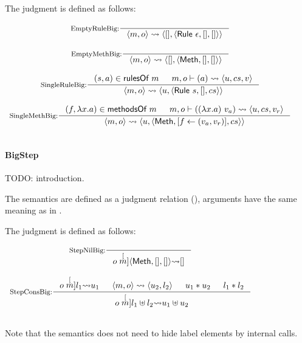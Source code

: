 \begin{definition}
  \label{def-sembigss}
  The judgment  is defined as follows:
  \begin{center}
    \begin{math}
      \begin{array}{c}
        \inference[EmptyRuleBig:]{}
                  {\sembigss{m}{o}{\emptymap}
                    {\alpharule{\epsilon}}{\emptymap}{\emptymap}} \\
        \mbox{} \\
        \inference[EmptyMethBig:]{}
                  {\sembigss{m}{o}{\emptymap}
                    {\alphameth}{\emptymap}{\emptymap}} \\
        \mbox{} \\
        \inference[SingleRuleBig:]{\rulepair{s}{a} \in \rulesofm{m} & \sembigact{m}{o}{a}{u}{cs}{v}}
                  {\sembigss{m}{o}{u}{\alpharule{s}}{\emptymap}{cs}} \\
        \mbox{} \\
        \inference[SingleMethBig:]{\methodpair{f}{\lambda x.a} \in \methsofm{m} &
          \sembigact{m}{o}{(\lambda x.a)\ v_a}{u}{cs}{v_r}}
                  {\sembigss{m}{o}{u}{\alphameth{}}{\lblupd{}{f}{(v_a, v_r)}}{cs}} \\
        \mbox{} \\
      \end{array}
    \end{math}
  \end{center}
\end{definition}

\paragraph{BigStep}

TODO: introduction.

The \Bigstep{} semantics are defined as a judgment relation
(), arguments have the same meaning as in
\Bigsubstep{}.

\begin{definition}
  \label{def-sembigstep}
  The judgment  is defined as follows:
  \begin{center}
    \begin{math}
      \begin{array}{c}
        \inference[StepNilBig:]{}
                  {\sembigstep{m}{o}{\emptymap}{\semlbl{\alphameth}{\emptymap}{\emptymap}}} \\
        \mbox{} \\
        \inference[StepConsBig:]{\sembigstep{m}{o}{u_1}{l_1} & \sembigssr{m}{o}{u_2}{l_2}
          & \sdisj{u_1}{u_2} & \ldisj{l_1}{l_2}}
                  {\sembigstep{m}{o}{\splus{u_1}{u_2}}{\lplus{l_1}{l_2}}} \\
        \mbox{} \\
      \end{array}
    \end{math}
  \end{center}
\end{definition}

Note that the \Bigstep{} semantics does not need to hide label
elements by internal calls.

